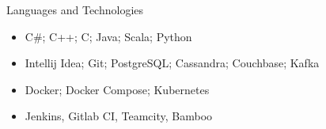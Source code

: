 \documentclass[]{cv}
\begin{document}
	\begin{cvsection}{Languages and Technologies}
		\begin{cvsubsection}{}{}{}
			\begin{itemize}
				\item C\#; C++; C; Java; Scala; Python
				\item Intellij Idea; Git; PostgreSQL; Cassandra; Couchbase; Kafka
				\item Docker; Docker Compose; Kubernetes
				\item Jenkins, Gitlab CI, Teamcity, Bamboo
			\end{itemize}
		\end{cvsubsection}
	\end{cvsection}
\end{document}
